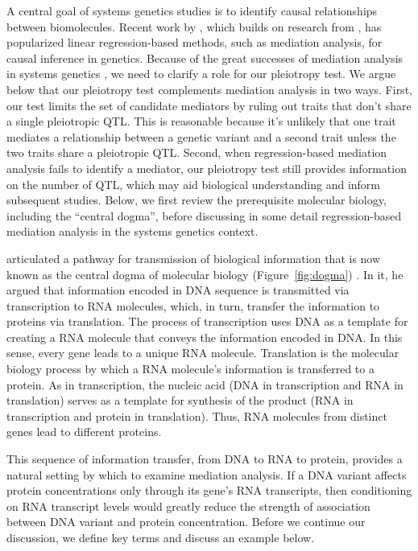\documentclass[oneside]{book}\usepackage[]{graphicx}\usepackage[]{color}
\begin{document}
A central goal of systems genetics studies is to identify causal relationships between biomolecules. 
Recent work by \citet{chick2016defining}, which builds on research from \citet{baron1986moderator}, has popularized linear regression-based methods, such as mediation analysis, for causal inference in genetics. 
Because of the great successes of mediation analysis in systems genetics \citep{chick2016defining,keller2018genetic}, we need to clarify a role for our pleiotropy test. 
We argue below that our pleiotropy test complements mediation analysis in two ways. 
First, our test limits the set of candidate mediators by ruling out traits that don't share a single pleiotropic QTL. 
This is reasonable because it's unlikely that one trait mediates a relationship between a genetic variant and a second trait unless the two traits share a pleiotropic QTL. 
Second, when regression-based mediation analysis fails to identify a mediator, our pleiotropy test still provides information on the number of QTL, which may aid biological understanding and inform subsequent studies. Below, we first review the prerequisite molecular biology, including the ``central dogma'', before discussing in some detail regression-based mediation analysis in the systems genetics context. 

\citet{crick1958protein} articulated a pathway for transmission of biological information that is now known as the central dogma of molecular biology (Figure~\ref{fig:dogma}) \citep{crick1970central}. 
In it, he argued that information encoded in DNA sequence is transmitted via transcription to 
RNA molecules, which, in turn, transfer the information to proteins via translation. 
The process of transcription uses DNA as a template for creating a RNA molecule that conveys the information encoded in DNA. 
In this sense, every gene leads to a unique RNA molecule. 
Translation is the molecular biology process by which a RNA molecule's information is transferred to a protein. 
As in transcription, the nucleic acid (DNA in transcription and RNA in translation) serves as a template for synthesis of the product (RNA in transcription and protein in translation). 
Thus, RNA molecules from distinct genes lead to different proteins.

This sequence of information transfer, from DNA to RNA to protein, provides a natural 
setting by which to examine mediation analysis. If a DNA variant affects protein 
concentrations only through its gene's RNA transcripts, then conditioning on RNA transcript 
levels would greatly reduce the strength of association between DNA variant and protein 
concentration. Before we continue our discussion, we define key terms and discuss an example below. 
\end{document}
